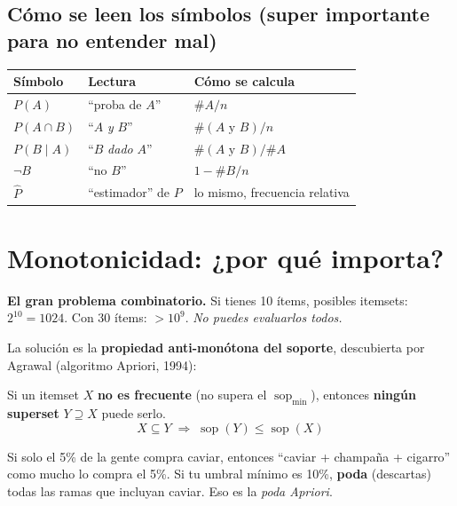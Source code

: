 \documentclass[11pt,a4paper]{article}
\newcommand{\sop}{\operatorname{sop}}
\begin{document}
\subsection{Cómo se leen los símbolos (super importante para no entender mal)}

\begin{center}
\begin{tabular}{@{}lll@{}}
\toprule
\textbf{Símbolo} & \textbf{Lectura} & \textbf{Cómo se calcula} \\
\midrule
$P(A)$        & ``proba de $A$''         & $\#A / n$ \\
$P(A \cap B)$ & ``$A$ \emph{y} $B$''     & $\#(A \text{ y } B)/n$ \\
$P(B \mid A)$ & ``$B$ \emph{dado} $A$''  & $\#(A \text{ y } B) / \#A$ \\
$\neg B$      & ``no $B$''                & $1 - \#B/n$ \\
$\hat{P}$     & ``estimador'' de $P$      & lo mismo, frecuencia relativa \\
\bottomrule
\end{tabular}
\end{center}

\section{Monotonicidad: ¿por qué importa?}

\textbf{El gran problema combinatorio.} Si tienes 10 ítems, posibles
itemsets: $2^{10}=1024$. Con 30 ítems: $> 10^9$. \emph{No puedes evaluarlos todos.}

La solución es la \textbf{propiedad anti-monótona del soporte}, descubierta por
Agrawal (algoritmo Apriori, 1994):

\begin{formulabox}
Si un itemset $X$ \textbf{no es frecuente} (no supera el $\sop_{\min}$), entonces
\textbf{ningún superset} $Y \supseteq X$ puede serlo.
\[
X \subseteq Y \;\Longrightarrow\; \sop(Y) \le \sop(X)
\]
\end{formulabox}

\begin{intuicionbox}
Si solo el 5\% de la gente compra caviar, entonces ``caviar + champaña + cigarro'' como
mucho lo compra el 5\%. Si tu umbral mínimo es 10\%, \textbf{poda} (descartas) todas las
ramas que incluyan caviar. Eso es la \emph{poda Apriori}.
\end{intuicionbox}
\end{document}
